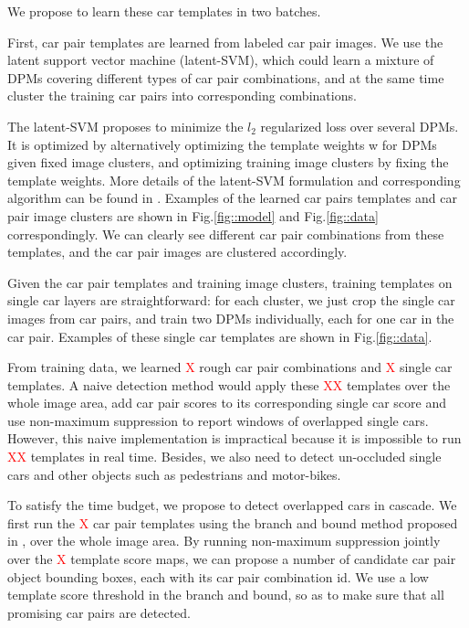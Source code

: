 \documentclass[times, 10pt,twocolumn]{article}
\begin{document}
We propose to learn these car templates in two batches. 

First, car pair templates are learned from labeled car pair images. We use the latent support vector machine (latent-SVM), which could learn a mixture of DPMs covering different types of car pair combinations, and at the same time cluster the training car pairs into corresponding combinations.  

The latent-SVM proposes to minimize the $l_2$ regularized loss over several DPMs. It is optimized by alternatively optimizing the template weights w for DPMs given fixed image clusters, and optimizing training image clusters by fixing the template weights. More details of the latent-SVM formulation and corresponding algorithm can be found in \cite{DPM}.  
Examples of the learned car pairs templates and car pair image clusters are shown in Fig.\ref{fig::model} and Fig.\ref{fig::data} correspondingly. We can clearly see different car pair combinations from these templates, and the car pair images are clustered accordingly. 

Given the car pair templates and training image clusters, training templates on single car layers are straightforward: for each cluster, we just crop the single car images from car pairs, and train two DPMs individually, each for one car in the car pair. Examples of these single car templates are shown in Fig.\ref{fig::data}.  



From training data, we learned \textcolor{red}{X} rough car pair combinations and \textcolor{red}{X}  single car templates. A naive detection method would apply these \textcolor{red}{XX}  templates over the whole image area, add car pair scores to its corresponding single car score and use non-maximum suppression to report windows of overlapped single cars. However, this naive implementation is impractical because it is impossible to run \textcolor{red}{XX}  templates in real time. Besides, we also need to detect un-occluded single cars and other objects such as pedestrians and motor-bikes. 

To satisfy the time budget, we propose to detect overlapped cars in cascade. We first run the \textcolor{red}{X}   car pair templates using the branch and bound method proposed in \cite{rapidDetection}, over the whole image area. By running non-maximum suppression jointly over the \textcolor{red}{X}   template score maps, we can propose a number of candidate car pair object bounding boxes, each with its car pair combination id.  We use a low template score threshold in the branch and bound, so as to make sure that all promising car pairs are detected.
\end{document}
